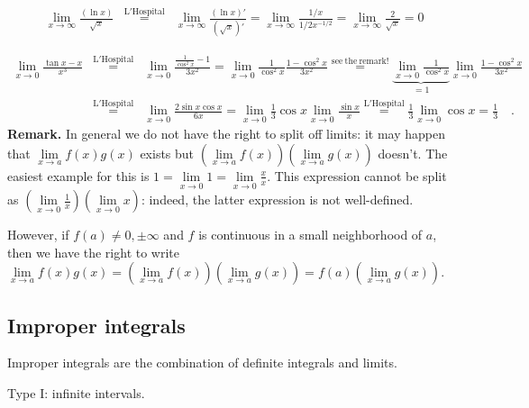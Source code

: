 \documentclass[12pt]{book}
\begin{document}
\[
\begin{array}{rcl}
\lim\limits_{x\to \infty} \frac{(\ln x)}{\sqrt{x}} &\stackrel{\mathrm{L'Hospital}}{=} & \lim\limits_{x\to \infty} \frac{(\ln x)'}{(\sqrt{x})'}=
 \lim\limits_{x\to \infty} \frac{1/x}{1/2x^{-1/2}}= \lim\limits_{x\to \infty} \frac{2}{\sqrt{x}}=0
\end{array}
\]

\[
\begin{array}{rcl}
\lim\limits_{x\to 0}\limits \frac{\tan x- x}{x^3}&\stackrel{\mathrm{L'Hospital}}{=} &\lim\limits_{x\to 0} \frac{\frac{1}{\cos^2 x}-1}{3x^2}=
\lim\limits_{x\to 0} \frac{1}{\cos^2x}\frac{1-\cos^2x}{3x^2}\stackrel{\mathrm{see~the~remark!}}{=}\underbrace{\lim\limits_{x\to 0} \frac{1}{\cos^2x}}_{=1} \lim\limits_{x\to 0} \frac{1-\cos^2x}{3x^2} \\
&\stackrel{\mathrm{L'Hospital}}{=}&\lim\limits_{x\to 0}\frac{2\sin x\cos x }{6x}= \lim\limits_{x\to 0}\frac 13\cos x\lim\limits_{x\to 0}\frac{\sin x}{x}\stackrel{\mathrm{L'Hospital}}{=}\frac 13\lim\limits_{x\to 0}\cos x= \frac 13\quad .
\end{array}
\]
\textbf{Remark.} In general we do not have the right to split off limits: it may happen that $\lim\limits_{x\to a} f(x)g(x)$ exists but $ \left(\lim\limits_{x\to a} f(x)\right) \left(\lim\limits_{x\to a} g(x)\right)$ doesn't. The easiest example for this is $1=\lim\limits_{x\to 0} 1 =  \lim\limits_{x\to 0} \frac{x}{x}$. This expression cannot be split as $\left(\lim\limits_{x\to 0} \frac{1}{x}\right)\left(\lim\limits_{x\to 0} x \right)$: indeed, the latter expression is not well-defined.

However, if $f(a)\neq 0, \pm \infty$ and $f$ is continuous in a small neighborhood of $a$, then we have the right to write $\lim\limits_{x\to a} f(x)g(x)= \left(\lim\limits_{x\to a} f(x)\right) \left(\lim\limits_{x\to a} g(x)\right)= f(a)\left(\lim\limits_{x\to a} g(x)\right)$.

\subsection{Improper integrals} \label{secImproperIntegrals}
 Improper integrals are the combination of definite integrals and limits.

Type I: infinite intervals.
\end{document}
